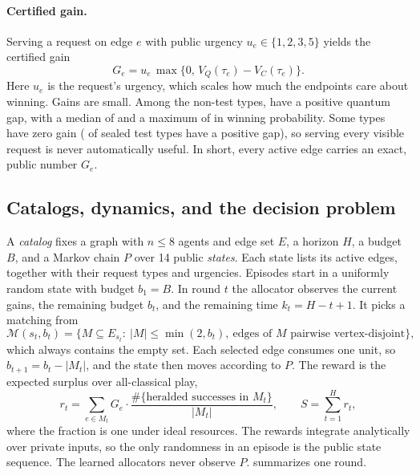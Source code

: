 \documentclass[10pt]{article}
\newcommand{\M}{\mathcal{M}}
\begin{document}
\paragraph{Certified gain.} Serving a request on edge $e$ with public urgency $u_e\in\{1,2,3,5\}$ yields the certified gain
\begin{equation}
  G_e=u_e\,\max\{0,\,V_Q(\tau_e)-V_C(\tau_e)\}.
  \label{eq:gain}
\end{equation}
Here $u_e$ is the request's urgency, which scales how much the endpoints care about winning. Gains are small. Among the \nonTestTypes{} non-test types, \nonTestPositive{} have a positive quantum gap, with a median of \gapMedian{} and a maximum of \gapMax{} in winning probability. Some types have zero gain (\testPositiveTypes{} of \testTypes{} sealed test types have a positive gap), so serving every visible request is never automatically useful. In short, every active edge carries an exact, public number $G_e$.

\subsection{Catalogs, dynamics, and the decision problem}\label{sec:mdp}

A \emph{catalog} fixes a graph with $n\le8$ agents and edge set $E$, a horizon $H$, a budget $B$, and a Markov chain $P$ over 14 public \emph{states}. Each state lists its active edges, together with their request types and urgencies. Episodes start in a uniformly random state with budget $b_1=B$.  In round $t$ the allocator observes the current gains, the remaining budget $b_t$, and the remaining time $k_t=H-t+1$. It picks a matching from
\begin{equation}
  \M(s_t,b_t)=\bigl\{M\subseteq E_{s_t}:\ |M|\le\min(2,b_t),\ \text{edges of $M$ pairwise vertex-disjoint}\bigr\},
\end{equation}
which always contains the empty set. Each selected edge consumes one unit, so $b_{t+1}=b_t-|M_t|$, and the state then moves according to $P$. The reward is the expected surplus over all-classical play,
\begin{equation}
  r_t=\sum_{e\in M_t}G_e\cdot\frac{\#\{\text{heralded successes in }M_t\}}{|M_t|},\qquad S=\sum_{t=1}^H r_t ,
\end{equation}
where the fraction is one under ideal resources. The rewards integrate analytically over private inputs, so the only randomness in an episode is the public state sequence. The learned allocators never observe $P$.  summarizes one round.
\end{document}
